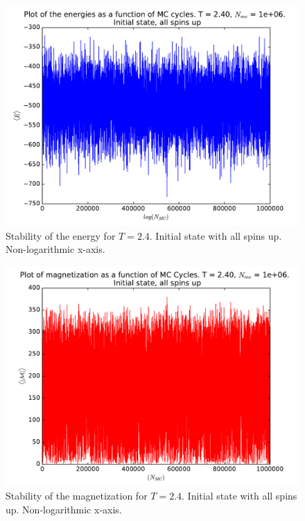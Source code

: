 \documentclass[12pt]{article}
\begin{document}
\begin{figure}[H]
\centering
\includegraphics[width=\linewidth]{Plots/Energy_stability_UpInitSpin_T24.pdf}
\caption{Stability of the energy for $T=2.4$. Initial state with all spins up. Non-logarithmic x-axis.}
\end{figure}

\begin{figure}[H]
\centering
\includegraphics[width=\linewidth]{Plots/Magnetization_stability_UpInitSpin_T24.pdf}
\caption{Stability of the magnetization for $T=2.4$. Initial state with all spins up. Non-logarithmic x-axis.}
\end{figure}
\end{document}
